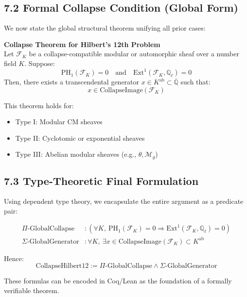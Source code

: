 \documentclass[11pt]{article}
\begin{document}
\subsection{7.2 Formal Collapse Condition (Global Form)}

We now state the global structural theorem unifying all prior cases:

\begin{center}
\textbf{Collapse Theorem for Hilbert’s 12th Problem}  
\\[0.5em]
Let \( \mathcal{F}_K \) be a collapse-compatible modular or automorphic sheaf over a number field \( K \).  
Suppose:
\[
\mathrm{PH}_1(\mathcal{F}_K) = 0 \quad \text{and} \quad \mathrm{Ext}^1(\mathcal{F}_K, \mathbb{Q}_\ell) = 0
\]
Then, there exists a transcendental generator \( x \in K^{\mathrm{ab}} \subset \overline{\mathbb{Q}} \) such that:
\[
x \in \text{CollapseImage}(\mathcal{F}_K)
\]
\end{center}

This theorem holds for:
\begin{itemize}
    \item Type I: Modular CM sheaves
    \item Type II: Cyclotomic or exponential sheaves
    \item Type III: Abelian modular sheaves (e.g., \( \theta, \mathcal{M}_g \))
\end{itemize}

\subsection{7.3 Type-Theoretic Final Formulation}

Using dependent type theory, we encapsulate the entire argument as a predicate pair:

\begin{align*}
\Pi\text{-GlobalCollapse} &\colon \left( \forall K,\ \mathrm{PH}_1(\mathcal{F}_K) = 0 \Rightarrow \mathrm{Ext}^1(\mathcal{F}_K, \mathbb{Q}_\ell) = 0 \right) \\
\Sigma\text{-GlobalGenerator} &\colon \forall K,\ \exists x \in \text{CollapseImage}(\mathcal{F}_K) \subset K^{\mathrm{ab}}
\end{align*}

Hence:
\[
\text{CollapseHilbert12} := \Pi\text{-GlobalCollapse} \wedge \Sigma\text{-GlobalGenerator}
\]

These formulas can be encoded in Coq/Lean as the foundation of a formally verifiable theorem.
\end{document}
